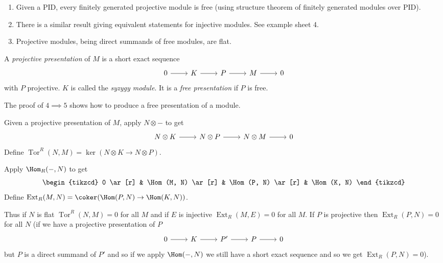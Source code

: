 \documentclass[a4paper]{article}
\DeclareMathOperator{\Tor}{Tor}
\DeclareMathOperator{\Ext}{Ext}
\begin{document}
\begin{remark}\leavevmode
  \begin{enumerate}
  \item Given a PID, every finitely generated projective module is free (using structure theorem of finitely generated modules over PID).
  \item There is a similar result giving equivalent statements for injective modules. See example sheet 4.
  \item Projective modules, being direct summands of free modules, are flat.
  \end{enumerate}
\end{remark}

\begin{definition}
  A \emph{projective presentation} of \(M\) is a short exact sequence
  \[
    \begin{tikzcd}
      0 \ar[r] & K \ar[r] & P \ar[r] & M \ar[r] & 0
    \end{tikzcd}
  \]
  with \(P\) projective. \(K\) is called the \emph{syzygy module}. It is a \emph{free presentation} if \(P\) is free.
\end{definition}

\begin{remark}
  The proof of \(4 \implies 5\) shows how to produce a free presentation of a module.
\end{remark}

\begin{definition}
  Given a projective presentation of \(M\), apply \(N \otimes -\) to get
  \[
    \begin{tikzcd}
      N \otimes K \ar[r] & N \otimes P \ar[r] & N \otimes M \ar[r] & 0
    \end{tikzcd}
  \]
  Define \(\Tor^R(N, M) = \ker (N \otimes K \to N \otimes P)\).

  Apply \(\Hom_R(-, N)\) to get
  \[
    \begin{tikzcd}
      0 \ar[r] & \Hom(M, N) \ar[r] & \Hom(P, N) \ar[r] & \Hom(K, N)
    \end{tikzcd}
  \]
  Define \(\Ext_R(M, N) = \coker(\Hom(P, N) \to \Hom(K, N))\).
\end{definition}

Thus if \(N\) is flat \(\Tor^R(N, M) = 0\) for all \(M\) and if \(E\) is injective \(\Ext_R(M, E) = 0\) for all \(M\). If \(P\) is projective then \(\Ext_R(P, N) = 0\) for all \(N\) (if we have a projective presentation of \(P\)
\[
  \begin{tikzcd}
    0 \ar[r] & K \ar[r] & P' \ar[r] & P \ar[r] & 0
  \end{tikzcd}
\]
but \(P\) is a direct summand of \(P'\) and so if we apply \(\Hom(-, N)\) we still have a short exact sequence and so we get \(\Ext_R(P, N) = 0\)).
\end{document}
